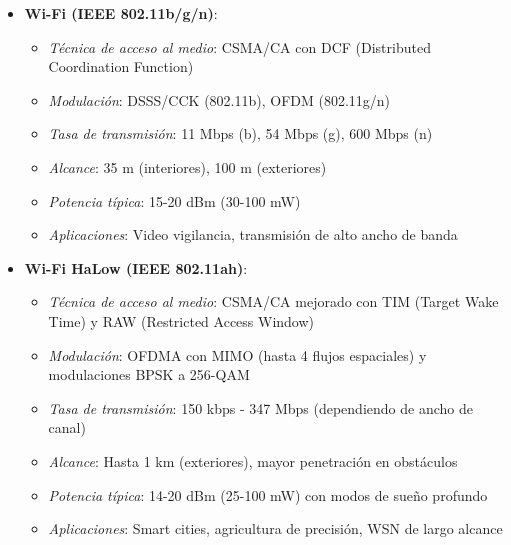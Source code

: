 \begin{itemize}
    \item \textbf{Wi-Fi (IEEE 802.11b/g/n)}:
        \begin{itemize}
            \item \textit{Técnica de acceso al medio}: CSMA/CA con DCF (Distributed Coordination Function)
            \item \textit{Modulación}: DSSS/CCK (802.11b), OFDM (802.11g/n)
            \item \textit{Tasa de transmisión}: 11 Mbps (b), 54 Mbps (g), 600 Mbps (n)
            \item \textit{Alcance}: 35 m (interiores), 100 m (exteriores)
            \item \textit{Potencia típica}: 15-20 dBm (30-100 mW)
            \item \textit{Aplicaciones}: Video vigilancia, transmisión de alto ancho de banda \cite{gerenciatecnologicainformatica2013}
        \end{itemize}
    
    \item \textbf{Wi-Fi HaLow (IEEE 802.11ah)}:
        \begin{itemize}
            \item \textit{Técnica de acceso al medio}: CSMA/CA mejorado con TIM (Target Wake Time) y RAW (Restricted Access Window)
            \item \textit{Modulación}: OFDMA con MIMO (hasta 4 flujos espaciales) y modulaciones BPSK a 256-QAM
            \item \textit{Tasa de transmisión}: 150 kbps - 347 Mbps (dependiendo de ancho de canal)
            \item \textit{Alcance}: Hasta 1 km (exteriores), mayor penetración en obstáculos
            \item \textit{Potencia típica}: 14-20 dBm (25-100 mW) con modos de sueño profundo
            \item \textit{Aplicaciones}: Smart cities, agricultura de precisión, WSN de largo alcance \cite{Adame2014}
        \end{itemize}
\end{itemize}



